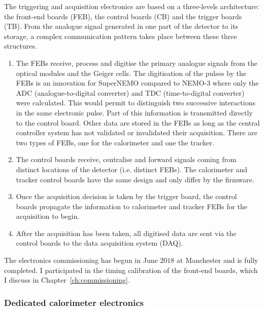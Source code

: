 The triggering and acquisition electronics are based on a three-levels architecture: the front-end boards (FEB), the control boards (CB) and the trigger boards (TB).
From the analogue signal generated in one part of the detector to its storage, a complex communication pattern takes place between these three structures.
\begin{enumerate}
\item The FEBs receive, process and digitise the primary analogue signals from the optical modules and the Geiger cells.
  The digitisation of the pulses by the FEBs is an innovation for SuperNEMO compared to NEMO-$3$ where only the ADC (analogue-to-digital converter) and TDC (time-to-digital converter) were calculated.
  This would permit to distinguish two successive interactions in the same electronic pulse.
  Part of this information is transmitted directly to the control board.
  Other data are stored in the FEBs as long as the central controller system has not validated or invalidated their acquisition.
  There are two types of FEBs, one for the calorimeter and one the tracker.
\item The control boards receive, centralise and forward signals coming from distinct locations of the detector (i.e. distinct FEBs).
  The calorimeter and tracker control boards have the same design and only differ by the firmware.
\item Once the acquisition decision is taken by the trigger board, the control boards propagate the information to calorimeter and tracker FEBs for the acquisition to begin.
\item After the acquisition has been taken, all digitised data are sent via the control boards to the data acquisition system (DAQ).
\end{enumerate}
The electronics commissioning has begun in June $2018$ at Manchester and is fully completed.
I participated in the timing calibration of the front-end boards, which I discuss in Chapter~\ref{ch:commissioning}.

\subsubsection*{Dedicated calorimeter electronics}

